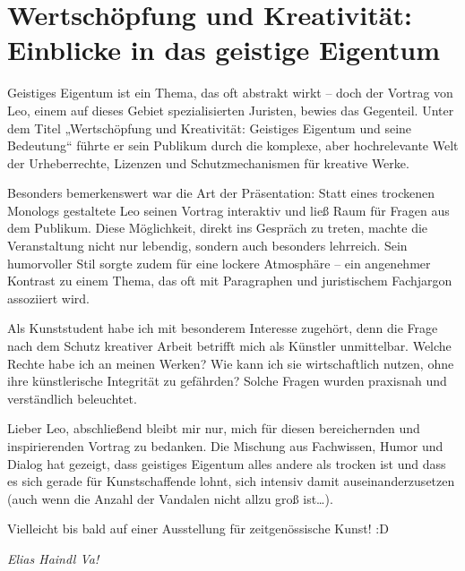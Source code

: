 \section{Wertschöpfung und Kreativität: Einblicke in das geistige Eigentum}

\begin{multicols}{2}
Geistiges Eigentum ist ein Thema, das oft
abstrakt wirkt – doch der Vortrag von Leo, einem auf dieses Gebiet
spezialisierten Juristen, bewies das Gegenteil. Unter dem Titel „Wertschöpfung
und Kreativität: Geistiges Eigentum und seine Bedeutung“ führte er sein
Publikum durch die komplexe, aber hochrelevante Welt der Urheberrechte,
Lizenzen und Schutzmechanismen für kreative Werke.

Besonders bemerkenswert war die Art der
Präsentation: Statt eines trockenen Monologs gestaltete Leo seinen Vortrag
interaktiv und ließ Raum für Fragen aus dem Publikum. Diese Möglichkeit, direkt
ins Gespräch zu treten, machte die Veranstaltung nicht nur lebendig, sondern
auch besonders lehrreich. Sein humorvoller Stil sorgte zudem für eine lockere
Atmosphäre – ein angenehmer Kontrast zu einem Thema, das oft mit Paragraphen
und juristischem Fachjargon assoziiert wird.

Als Kunststudent habe ich mit besonderem
Interesse zugehört, denn die Frage nach dem Schutz kreativer Arbeit betrifft
mich als Künstler unmittelbar. Welche Rechte habe ich an meinen Werken? Wie
kann ich sie wirtschaftlich nutzen, ohne ihre künstlerische Integrität zu
gefährden? Solche Fragen wurden praxisnah und verständlich beleuchtet.

Lieber Leo, abschließend bleibt mir nur,
mich für diesen bereichernden und inspirierenden Vortrag zu bedanken. Die
Mischung aus Fachwissen, Humor und Dialog hat gezeigt, dass geistiges Eigentum
alles andere als trocken ist und dass es sich gerade für Kunstschaffende lohnt,
sich intensiv damit auseinanderzusetzen (auch wenn die Anzahl der Vandalen
nicht allzu groß ist…).

Vielleicht bis bald auf einer Ausstellung für
zeitgenössische Kunst! :D
\end{multicols}

\begin{flushright}
		\hfill\emph{Elias Haindl Va!}
	\end{flushright}
			
